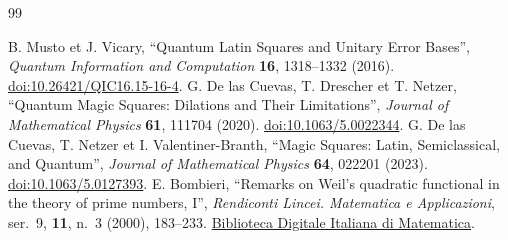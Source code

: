 \begin{thebibliography}{99}
 B. Musto et J. Vicary, ``Quantum Latin Squares and Unitary Error Bases'', \emph{Quantum Information and Computation} \textbf{16}, 1318--1332 (2016). \href{https://doi.org/10.26421/QIC16.15-16-4}{doi:10.26421/QIC16.15-16-4}.
 G. De las Cuevas, T. Drescher et T. Netzer, ``Quantum Magic Squares: Dilations and Their Limitations'', \emph{Journal of Mathematical Physics} \textbf{61}, 111704 (2020). \href{https://doi.org/10.1063/5.0022344}{doi:10.1063/5.0022344}.
 G. De las Cuevas, T. Netzer et I. Valentiner-Branth, ``Magic Squares: Latin, Semiclassical, and Quantum'', \emph{Journal of Mathematical Physics} \textbf{64}, 022201 (2023). \href{https://doi.org/10.1063/5.0127393}{doi:10.1063/5.0127393}.
 E. Bombieri,
``Remarks on Weil's quadratic functional in the theory of prime numbers, I'',
\emph{Rendiconti Lincei. Matematica e Applicazioni},
ser.~9, \textbf{11}, n.~3 (2000), 183--233.
\href{https://www.bdim.eu/item?id=RLIN_2000_9_11_3_183_0}{Biblioteca Digitale Italiana di Matematica}.
\end{thebibliography}
